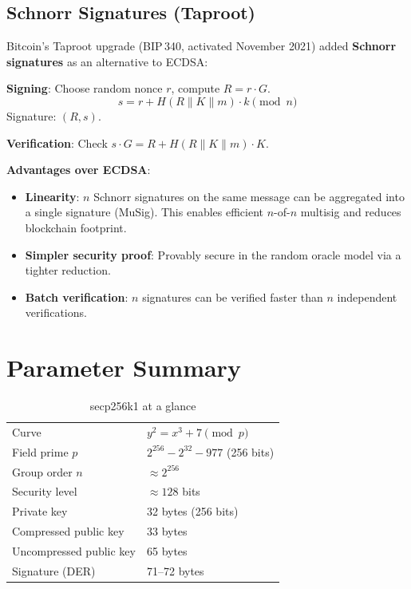 \documentclass[12pt,a4paper,openany]{book}
\theoremstyle{definition}
\theoremstyle{plain}
\theoremstyle{remark}
\begin{document}
\subsection{Schnorr Signatures (Taproot)}

Bitcoin's Taproot upgrade (BIP\,340, activated November 2021) added
\textbf{Schnorr signatures} as an alternative to ECDSA:

\textbf{Signing}: Choose random nonce $r$, compute $R=r\cdot G$.
\[
  s = r + H(R\|K\|m)\cdot k \pmod n
\]
Signature: $(R, s)$.

\textbf{Verification}: Check $s\cdot G = R + H(R\|K\|m)\cdot K$.

\textbf{Advantages over ECDSA}:
\begin{itemize}
  \item \textbf{Linearity}: $n$ Schnorr signatures on the same message
        can be aggregated into a single signature (MuSig).  This enables
        efficient $n$-of-$n$ multisig and reduces blockchain footprint.
  \item \textbf{Simpler security proof}: Provably secure in the random
        oracle model via a tighter reduction.
  \item \textbf{Batch verification}: $n$ signatures can be verified
        faster than $n$ independent verifications.
\end{itemize}

\section{Parameter Summary}

\begin{table}[h]
\centering
\caption{secp256k1 at a glance}
\begin{tabular}{ll}
\toprule
Curve & $y^2=x^3+7\pmod p$ \\
Field prime $p$ & $2^{256}-2^{32}-977$ (256 bits) \\
Group order $n$ & $\approx 2^{256}$ \\
Security level & $\approx 128$ bits \\
Private key & 32 bytes (256 bits) \\
Compressed public key & 33 bytes \\
Uncompressed public key & 65 bytes \\
Signature (DER) & 71--72 bytes \\
\bottomrule
\end{tabular}
\end{table}
\end{document}

